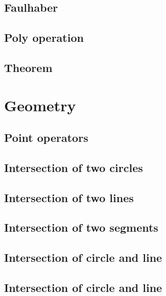 \documentclass[a4paper,10pt,twocolumn,oneside]{article}
\begin{document}
\subsection{Faulhaber}


\subsection{Poly operation}


\subsection{Theorem}



\section{Geometry}
\subsection{Point operators}


\subsection{Intersection of two circles}


\subsection{Intersection of two lines}


\subsection{Intersection of two segments}


\subsection{Intersection of circle and line}


\subsection{Intersection of circle and line}

\end{document}
